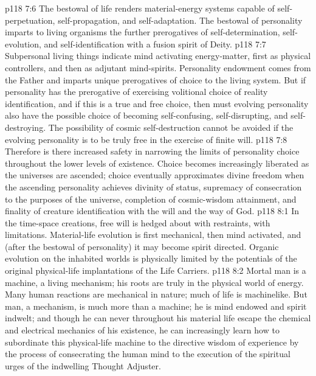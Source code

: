 \vs p118 7:6 \pc The bestowal of life renders material\hyp{}energy systems capable of self\hyp{}perpetuation, self\hyp{}propagation, and self\hyp{}adaptation. The bestowal of personality imparts to living organisms the further prerogatives of self\hyp{}determination, self\hyp{}evolution, and self\hyp{}identification with a fusion spirit of Deity.
\vs p118 7:7 Subpersonal living things indicate mind activating energy\hyp{}matter, first as physical controllers, and then as adjutant mind\hyp{}spirits. Personality endowment comes from the Father and imparts unique prerogatives of choice to the living system. But if personality has the prerogative of exercising volitional choice of reality identification, and if this is a true and free choice, then must evolving personality also have the possible choice of becoming self\hyp{}confusing, self\hyp{}disrupting, and self\hyp{}destroying. The possibility of cosmic self\hyp{}destruction cannot be avoided if the evolving personality is to be truly free in the exercise of finite will.
\vs p118 7:8 Therefore is there increased safety in narrowing the limits of personality choice throughout the lower levels of existence. Choice becomes increasingly liberated as the universes are ascended; choice eventually approximates divine freedom when the ascending personality achieves divinity of status, supremacy of consecration to the purposes of the universe, completion of cosmic\hyp{}wisdom attainment, and finality of creature identification with the will and the way of God.
\vs p118 8:1 In the time\hyp{}space creations, free will is hedged about with restraints, with limitations. Material\hyp{}life evolution is first mechanical, then mind activated, and (after the bestowal of personality) it may become spirit directed. Organic evolution on the inhabited worlds is physically limited by the potentials of the original physical\hyp{}life implantations of the Life Carriers.
\vs p118 8:2 Mortal man is a machine, a living mechanism; his roots are truly in the physical world of energy. Many human reactions are mechanical in nature; much of life is machinelike. But man, a mechanism, is much more than a machine; he is mind endowed and spirit indwelt; and though he can never throughout his material life escape the chemical and electrical mechanics of his existence, he can increasingly learn how to subordinate this physical\hyp{}life machine to the directive wisdom of experience by the process of consecrating the human mind to the execution of the spiritual urges of the indwelling Thought Adjuster.
